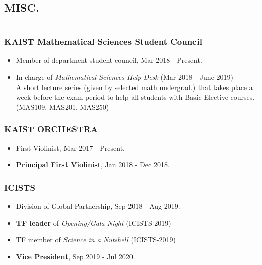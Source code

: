 \documentclass[10pt,a4]{article}
\begin{document}
\begin{small}
\subsection*{MISC.}
\hrule
\vspace{0.2cm}

\subsubsection*{KAIST Mathematical Sciences Student Council}
\begin{itemize}
	\item Member of department student council, Mar 2018 - Present.
	
	\item In charge of {\it Mathematical Sciences Help-Desk} (Mar 2018 - June 2019) \\
	A short lecture series (given by selected math undergrad.) that takes place a week before the exam period to help all students with Basic Elective courses. (MAS109, MAS201, MAS250)
\end{itemize}


\subsubsection*{KAIST ORCHESTRA}
\begin{itemize}
	\item First Violinist, Mar 2017 - Present.
	
	\item {\bf Principal First Violinist}, Jan 2018 - Dec 2018.
	
\end{itemize}

\subsubsection*{ICISTS}
\begin{itemize}
	\item Division of Global Partnership, Sep 2018 - Aug 2019.
	
	\item {\bf TF leader} of {\it Opening/Gala Night} (ICISTS-2019)
	
	\item TF member of {\it Science in a Nutshell} (ICISTS-2019)
	
	\item {\bf Vice President}, Sep 2019 - Jul 2020.
	

\end{itemize}
\end{small}
\end{document}
